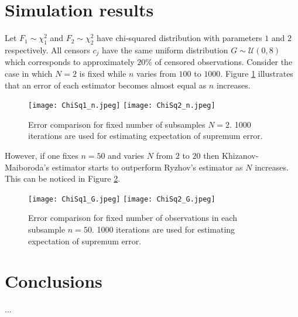\documentclass[12pt,reqno,a4paper,oneside,draft]{article}
\theoremstyle{plain}
\theoremstyle{definition}
\theoremstyle{remark}
\begin{document}
\section{Simulation results}
\label{sec:Simulation_results}
Let $F_1\sim \chi ^2_1$ and $F_2\sim \chi ^2_2$ have chi-squared distribution with parameters $1$ and $2$ respectively. All censors $c_j$ have the same uniform distribution $G\sim \mathcal U(0, 8)$ which corresponds to approximately $20\%$ of censored observations. Consider the case in which $N=2$ is fixed while $n$ varies from $100$ to $1000$. Figure \ref{fig:1} illustrates that an error of each estimator becomes almost equal as $n$ increases.
\begin{figure}
\centering
\caption{\label{fig:1}Error comparison for fixed number of subsamples $N=2$. 1000 iterations are used for estimating expectation of supremum error.}
\texttt{[image: ChiSq1\_n.jpeg]}
\texttt{[image: ChiSq2\_n.jpeg]}
\end{figure}


However, if one fixes $n=50$ and varies $N$ from $2$ to $20$ then Khizanov-Maiboroda's estimator starts to outperform Ryzhov's estimator as $N$ increases. This can be noticed in Figure \ref{fig:2}.
\begin{figure}
\centering
\caption{\label{fig:2}Error comparison for fixed number of observations in each subsample $n=50$. 1000 iterations are used for estimating expectation of supremum error.}
\texttt{[image: ChiSq1\_G.jpeg]}
\texttt{[image: ChiSq2\_G.jpeg]}
\end{figure}



\section{Conclusions}
\label{sec:Conclusions}
...
\end{document}
